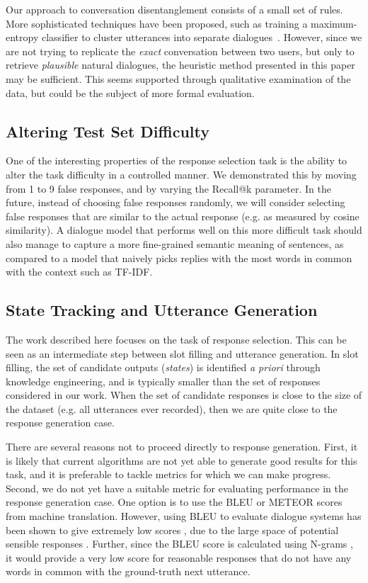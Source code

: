 \documentclass[11pt,a4paper]{article}
\begin{document}
Our approach to conversation disentanglement consists of a small set of rules.  More sophisticated techniques have been proposed, such as training a maximum-entropy classifier to cluster utterances into separate dialogues~\cite{elsner2008you}. However, since we are not trying to replicate the \textit{exact} conversation between two users, but only to retrieve \textit{plausible} natural dialogues, the heuristic method presented in this paper may be sufficient. This seems supported through qualitative examination of the data, but could be the subject of more formal evaluation. 

\subsection{Altering Test Set Difficulty}

One of the interesting properties of the response selection task is the ability to alter the task difficulty in a controlled manner. We demonstrated this by moving from 1 to 9 false responses, and by varying the Recall@k parameter.  In the future, instead of choosing false responses randomly, we will consider selecting false responses that are similar to the actual response (e.g. as measured by cosine similarity). A dialogue model that performs well on this more difficult task should also manage to capture a more fine-grained semantic meaning of sentences, as compared to a model that naively picks replies with the most words in common with the context such as TF-IDF.

\subsection{State Tracking and Utterance Generation}

The work described here focuses on the task of response selection. This can be seen as an intermediate step between slot filling and utterance generation.  In slot filling, the set of candidate outputs (\emph{states}) is identified \emph{a priori} through knowledge engineering, and is typically smaller than the set of responses considered in our work.  When the set of candidate responses is close to the size of the dataset (e.g. all utterances ever recorded), then we are quite close to the response generation case.



There are several reasons not to proceed directly to response generation.  First, it is likely that current algorithms are not yet able to generate good results for this task, and it is preferable to tackle metrics for which we can make progress.  Second, we do not yet have a suitable metric for evaluating performance in the response generation case.  
One option is to use the BLEU \cite{papineni2002bleu} or METEOR \cite{Lavie2009} scores from machine translation. However, using BLEU to evaluate dialogue systems has been shown to give extremely low scores \cite{sordoni2015}, due to the large space of potential sensible responses \cite{galley2015deltableu}.   Further, since the BLEU score is calculated using N-grams \cite{papineni2002bleu}, it would provide a very low score for reasonable responses that do not have any words in common with the ground-truth next utterance.
\end{document}
